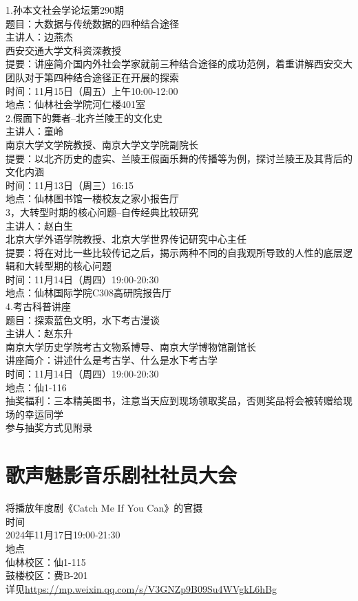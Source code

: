 \documentclass[letterpaper, 12pt]{article}
\begin{document}
\begin{multicols}{2}
1.孙本文社会学论坛第290期
\\题目：大数据与传统数据的四种结合途径
\\主讲人：边燕杰
\\西安交通大学文科资深教授
\\提要：讲座简介国内外社会学家就前三种结合途径的成功范例，着重讲解西安交大团队对于第四种结合途径正在开展的探索
\\时间：11月15日（周五）上午10:00-12:00
\\地点：仙林社会学院河仁楼401室\\
2.假面下的舞者--北齐兰陵王的文化史
\\主讲人：童岭
\\南京大学文学院教授、南京大学文学院副院长
\\提要：以北齐历史的虚实、兰陵王假面乐舞的传播等为例，探讨兰陵王及其背后的文化内涵
\\时间：11月13日（周三）16:15
\\地点：仙林图书馆一楼校友之家小报告厅\\
3，大转型时期的核心问题--自传经典比较研究
\\主讲人：赵白生
\\北京大学外语学院教授、北京大学世界传记研究中心主任
\\提要：将在对比一些比较传记之后，揭示两种不同的自我观所导致的人性的底层逻辑和大转型期的核心问题
\\时间：11月14日（周四）19:00-20:30
\\地点：仙林国际学院C308高研院报告厅\\
4.考古科普讲座
\\题目：探索蓝色文明，水下考古漫谈
\\主讲人：赵东升
\\南京大学历史学院考古文物系博导、南京大学博物馆副馆长
\\讲座简介：讲述什么是考古学、什么是水下考古学
\\时间：11月14日（周四）19:00-20:30
\\地点：仙1-116
\\抽奖福利：三本精美图书，注意当天应到现场领取奖品，否则奖品将会被转赠给现场的幸运同学
\\参与抽奖方式见附录

\section{歌声魅影音乐剧社社员大会}
将播放年度剧《Catch Me If You Can》的官摄\\
时间\\
2024年11月17日19:00-21:30\\
地点\\
仙林校区：仙1-115\\ 
鼓楼校区：费B-201\\
详见\url{https://mp.weixin.qq.com/s/V3GNZp9B09Su4WVgkL6hBg}\\


\end{multicols}
\end{document}
